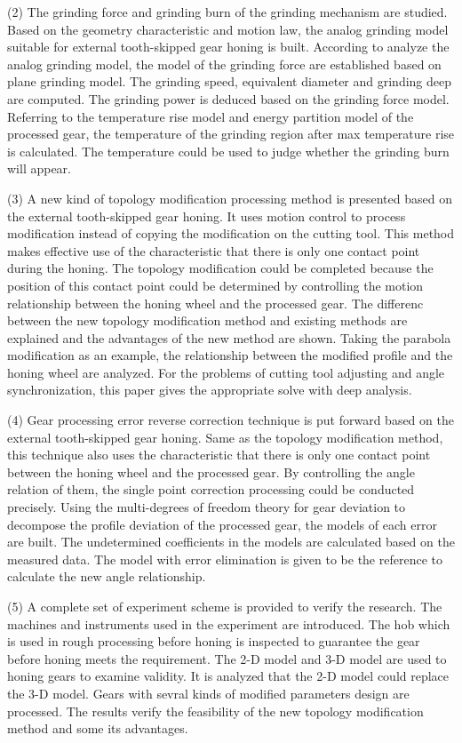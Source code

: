 \begin{enabstract}
(2) The grinding force and grinding burn of the grinding mechanism are studied.
Based on the geometry characteristic and motion law, the analog grinding model
suitable for external tooth-skipped gear honing is built. According to analyze the
analog grinding model, the model of the grinding force are established based on plane
grinding model. The grinding speed, equivalent diameter and grinding deep are
computed. The grinding power is deduced based on the grinding force model.
Referring to the temperature rise model and energy partition model of the processed
gear, the temperature of the grinding region after max temperature rise is calculated.
The temperature could be used to judge whether the grinding burn will appear.

(3) A new kind of topology modification processing method is presented based
on the external tooth-skipped gear honing. It uses motion control to process
modification instead of copying the modification on the cutting tool. This method
makes effective use of the characteristic that there is only one contact point during the
honing. The topology modification could be completed because the position of this
contact point could be determined by controlling the motion relationship between the
honing wheel and the processed gear. The differenc between the new topology
modification method and existing methods are explained and the advantages of the
new method are shown. Taking the parabola modification as an example, the
relationship between the modified profile and the honing wheel are analyzed. For the
problems of cutting tool adjusting and angle synchronization, this paper gives the
appropriate solve with deep analysis.

(4) Gear processing error reverse correction technique is put forward based on
the external tooth-skipped gear honing. Same as the topology modification method,
this technique also uses the characteristic that there is only one contact point between
the honing wheel and the processed gear. By controlling the angle relation of them,
the single point correction processing could be conducted precisely. Using the
multi-degrees of freedom theory for gear deviation to decompose the profile deviation
of the processed gear, the models of each error are built. The undetermined
coefficients in the models are calculated based on the measured data. The model with
error elimination is given to be the reference to calculate the new angle relationship.

(5) A complete set of experiment scheme is provided to verify the research. The
machines and instruments used in the experiment are introduced. The hob which is
used in rough processing before honing is inspected to guarantee the gear before
honing meets the requirement. The 2-D model and 3-D model are used to honing
gears to examine validity. It is analyzed that the 2-D model could replace the 3-D
model. Gears with sevral kinds of modified parameters design are processed. The
results verify the feasibility of the new topology modification method and some its
advantages.
\end{enabstract}
